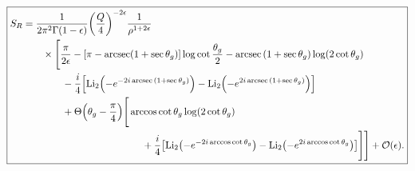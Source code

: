 \documentclass[11pt,twoside,reqno]{amsart}
\theoremstyle{plain}
\theoremstyle{remark}
\theoremstyle{definition}
\theoremstyle{remark}
\theoremstyle{definition}
\theoremstyle{definition}
\newcommand{\cO}{\mathcal{O}}
\newcommand{\Li}{\mathrm{Li}}
\begin{document}
	\begin{equation}
	\boxed{
	\begin{aligned}
		S_R &= \frac{1}{2\pi^2\Gamma(1 - \epsilon)}\qty(\frac{Q}{4})^{-2\epsilon} \frac{1}{\rho^{1 + 2\epsilon}} \\
			&\qquad\times \Bigg[\frac{\pi}{2\epsilon} - \qty[\pi - \arcsec(1 + \sec\theta_g)]\log\cot\frac{\theta_g}{2} - \arcsec\qty(1 + \sec\theta_g) \log(2\cot\theta_g) \\
			&\qquad\qquad - \frac{i}{4}\qty[\Li_2\qty(-e^{-2i\arcsec\qty(1 + \sec\theta_g)}) - \Li_2\qty(-e^{2i\arcsec\qty(1 + \sec\theta_g)})] \\
			&\qquad\qquad+ \Theta\qty(\theta_g - \frac{\pi}{4})\Bigg[ \arccos\cot\theta_g \log(2\cot\theta_g) \\
			&\hspace{4.25cm}+ \frac{i}{4}\qty[\Li_2\qty(-e^{-2i\arccos\cot\theta_g}) - \Li_2\qty(-e^{2i\arccos\cot\theta_g})] \Bigg] \Bigg] + \cO(\epsilon).
	\end{aligned}
	}
	\end{equation}
\end{document}
